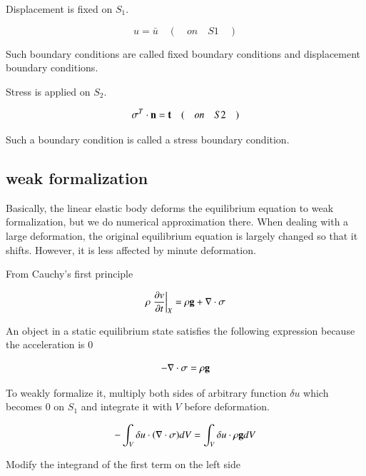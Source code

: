 Displacement is fixed on $S_1$.

\begin{equation}
u=\bar{u} \quad ( \quad on \quad S1 \quad )
\end{equation}


Such boundary conditions are called fixed boundary conditions and displacement boundary conditions.

Stress is applied on $S_2$.

\begin{equation}
\mathbf{\sigma}^T\cdot\mathbf{n}=\mathbf{t} \quad ( \quad on \quad S2 \quad )
\end{equation}


Such a boundary condition is called a stress boundary condition.



\subsection{weak formalization}


Basically, the linear elastic body deforms the equilibrium equation to weak formalization, but we do numerical approximation there. When dealing with a large deformation, the original equilibrium equation is largely changed so that it shifts. However, it is less affected by minute deformation.

From Cauchy's first principle

\begin{equation}
\rho\left.\frac{\partial v}{\partial t}\right|_X=\rho\mathbf{g}+\nabla\cdot\mathbf{\sigma}
\end{equation}


An object in a static equilibrium state satisfies the following expression because the acceleration is 0

\begin{equation}
-\nabla\cdot\mathbf{\sigma}=\rho\mathbf{g}
\end{equation}


To weakly formalize it, multiply both sides of arbitrary function $\delta u$ which becomes 0 on $S_1$ and integrate it with $V$ before deformation.

\begin{equation}
-\int_V\delta u\cdot(\nabla\cdot\mathbf{\sigma})dV=\int_V\delta u\cdot\rho\mathbf{g}dV
\end{equation}


Modify the integrand of the first term on the left side


